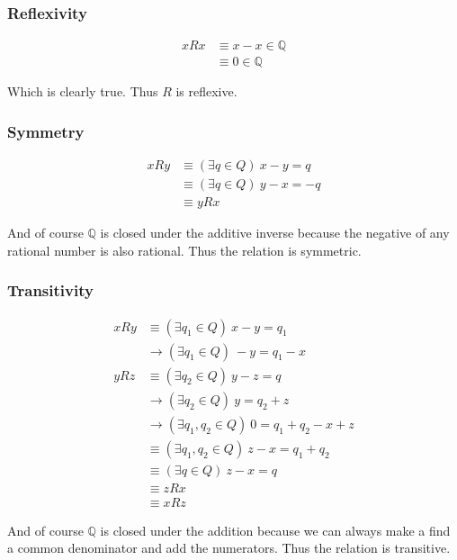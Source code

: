 \documentclass{article}
\begin{document}
\subsubsection*{Reflexivity}
\begin{align*}
xRx&\equiv x-x\in\mathbb Q\\
&\equiv 0\in\mathbb Q
\end{align*}

Which is clearly true. Thus $R$ is reflexive.

\subsubsection*{Symmetry}
\begin{align*}
  xRy&\equiv (\exists q\in Q)\ x-y=q\\
  &\equiv(\exists q\in Q)\ y-x=-q\tag{anti-commutativity of subtraction}\\
  &\equiv yRx\tag{closure of $\mathbb Q$ under additive inverse}
\end{align*}

And of course $\mathbb Q$ is closed under the additive inverse because the negative of any rational number is also rational. Thus the relation is symmetric.

\subsubsection*{Transitivity}
\begin{align*}
xRy&\equiv (\exists q_1\in Q)\ x-y=q_1\tag{definition}\\
&\rightarrow (\exists q_1\in Q)\ -y=q_1-x\tag{arithmetic}\\
yRz&\equiv (\exists q_2\in Q)\ y-z=q\tag{definition}\\
&\rightarrow (\exists q_2\in Q)\ y=q_2+z\tag{arithmetic}\\
&\rightarrow(\exists q_1,q_2\in Q)\ 0=q_1+q_2-x+z\tag{sum of lines 2 \& 4}\\
&\equiv(\exists q_1,q_2\in Q)\ z-x=q_1+q_2\tag{arithmetic}\\
&\equiv(\exists q\in Q)\ z-x=q\tag{closure of $\mathbb Q$ under addition}\\
&\equiv zRx \tag{definition}\\
&\equiv xRz \tag{symmetry of $R$}
\end{align*}

And of course $\mathbb Q$ is closed under the addition because we can always make a find a common denominator and add the numerators. Thus the relation is transitive.
\end{document}
